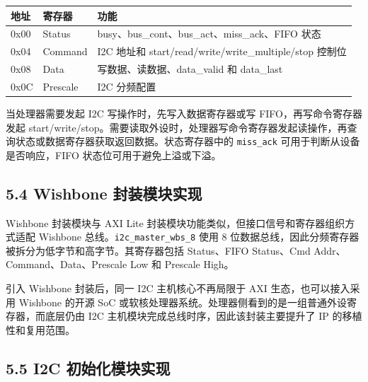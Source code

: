 {\def\LTcaptype{none} %
\begin{longtable}[]{@{}
  >{\raggedright\arraybackslash}p{}
  >{\raggedright\arraybackslash}p{}
  >{\raggedright\arraybackslash}p{}@{}}
\toprule\noalign{}
\begin{minipage}[b]{\linewidth}\raggedright
地址
\end{minipage} & \begin{minipage}[b]{\linewidth}\raggedright
寄存器
\end{minipage} & \begin{minipage}[b]{\linewidth}\raggedright
功能
\end{minipage} \\
\midrule\noalign{}
\endhead
\bottomrule\noalign{}
\endlastfoot
0x00 & Status & busy、bus\_cont、bus\_act、miss\_ack、FIFO 状态 \\
0x04 & Command & I2C 地址和 start/read/write/write\_multiple/stop
控制位 \\
0x08 & Data & 写数据、读数据、data\_valid 和 data\_last \\
0x0C & Prescale & I2C 分频配置 \\
\end{longtable}
}

当处理器需要发起 I2C 写操作时，先写入数据寄存器或写
FIFO，再写命令寄存器发起
start/write/stop。需要读取外设时，处理器写命令寄存器发起读操作，再查询状态或数据寄存器获取返回数据。状态寄存器中的
\texttt{miss\_ack} 可用于判断从设备是否响应，FIFO
状态位可用于避免上溢或下溢。

\subsection{5.4 Wishbone
封装模块实现}\label{wishbone-ux5c01ux88c5ux6a21ux5757ux5b9eux73b0}

Wishbone 封装模块与 AXI Lite
封装模块功能类似，但接口信号和寄存器组织方式适配 Wishbone
总线。\texttt{i2c\_master\_wbs\_8} 使用 8
位数据总线，因此分频寄存器被拆分为低字节和高字节。其寄存器包括
Status、FIFO Status、Cmd Addr、Command、Data、Prescale Low 和 Prescale
High。

引入 Wishbone 封装后，同一 I2C 主机核心不再局限于 AXI
生态，也可以接入采用 Wishbone 的开源 SoC
或软核处理器系统。处理器侧看到的是一组普通外设寄存器，而底层仍由 I2C
主机模块完成总线时序，因此该封装主要提升了 IP 的移植性和复用范围。

\subsection{5.5 I2C
初始化模块实现}\label{i2c-ux521dux59cbux5316ux6a21ux5757ux5b9eux73b0}

